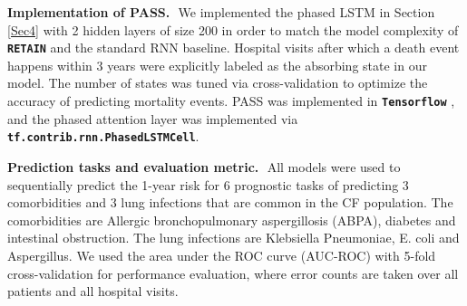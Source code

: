 \documentclass[twoside,11pt]{article}
\begin{document}
{\bf Implementation of PASS.}\,\, We implemented the phased LSTM in Section \ref{Sec4} with 2 hidden layers of size 200 in order to match the model complexity of {\small {\textbf{\texttt{RETAIN}}}} and the standard RNN baseline. Hospital visits after which a death event happens within 3 years were explicitly labeled as the absorbing state \mbox{\footnotesize } in our model. The number of states \mbox{\footnotesize } was tuned via cross-validation to optimize the accuracy of predicting mortality events. PASS was implemented in {\small {\textbf{\texttt{Tensorflow}}}} \cite{abadi2016tensorflow}, and the phased attention layer was implemented via {\small {\textbf{\texttt{tf.contrib.rnn.PhasedLSTMCell}}}}. 

{\bf Prediction tasks and evaluation metric.}\,\, All models were used to sequentially predict the 1-year risk for 6 prognostic tasks of predicting 3 comorbidities and 3 lung infections that are common in the CF population. The comorbidities are Allergic bronchopulmonary aspergillosis (ABPA), diabetes and intestinal obstruction. The lung infections are Klebsiella Pneumoniae, E. coli and Aspergillus. We used the area under the ROC curve (AUC-ROC) with 5-fold cross-validation for performance evaluation, where error counts are taken over all patients and all hospital visits.
\end{document}
